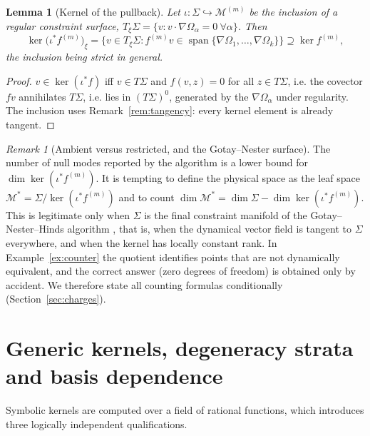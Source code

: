 \documentclass[12pt]{article}
\theoremstyle{plain}
\newtheorem{lemma}[theorem]{Lemma}
\theoremstyle{definition}
\theoremstyle{remark}
\newtheorem{remark}[theorem]{Remark}
\DeclareMathOperator{\spn}{span}
\newcommand{\Om}{\Omega}
\newcommand{\Mm}{\mathcal{M}}
\begin{document}
	\begin{lemma}[Kernel of the pullback]
		\label{lem:pullback}
		Let $\iota:\Sigma\hookrightarrow\Mm^{(m)}$ be the inclusion of a regular
		constraint surface, $T_{\xi}\Sigma=\{v:v\cdot\nabla\Om_{\alpha}=0\ \forall\alpha\}$.
		Then
		\begin{equation}
			\ker\bigl(\iota^{*}f^{(m)}\bigr)_{\xi}
			=\{v\in T_{\xi}\Sigma:f^{(m)}v\in\spn\{\nabla\Om_{1},\dots,\nabla\Om_{k}\}\}
			\supseteq\ker f^{(m)},
			\label{eq:pullback}
		\end{equation}
		the inclusion being strict in general.
	\end{lemma}
	
	\begin{proof}
		$v\in\ker(\iota^{*}f)$ iff $v\in T\Sigma$ and $f(v,z)=0$ for all $z\in T\Sigma$,
		i.e. the covector $fv$ annihilates $T\Sigma$, i.e. lies in $(T\Sigma)^{0}$,
		generated by the $\nabla\Om_{\alpha}$ under regularity. The inclusion uses
		Remark~\ref{rem:tangency}: every kernel element is already tangent.
	\end{proof}
	
	\begin{remark}[Ambient versus restricted, and the Gotay--Nester surface]
		\label{rem:gotay}
		The number of null modes reported by the algorithm is a lower bound for
		$\dim\ker(\iota^{*}f^{(m)})$. It is tempting to define the physical space as the
		leaf space $\Mm^{*}=\Sigma/\ker(\iota^{*}f^{(m)})$ and to count
		$\dim\Mm^{*}=\dim\Sigma-\dim\ker(\iota^{*}f^{(m)})$. This is legitimate only
		when $\Sigma$ is the final constraint manifold of the Gotay--Nester--Hinds
		algorithm \cite{GNH1978}, that is, when the dynamical vector field is tangent to
		$\Sigma$ everywhere, and when the kernel has locally constant rank. In
		Example~\ref{ex:counter} the quotient identifies points that are not dynamically
		equivalent, and the correct answer (zero degrees of freedom) is obtained only by
		accident. We therefore state all counting formulas conditionally
		(Section~\ref{sec:charges}).
	\end{remark}
	
	\section{Generic kernels, degeneracy strata and basis dependence}
	\label{sec:strata}
	
	Symbolic kernels are computed over a field of rational functions, which
	introduces three logically independent qualifications.
	
\end{document}
